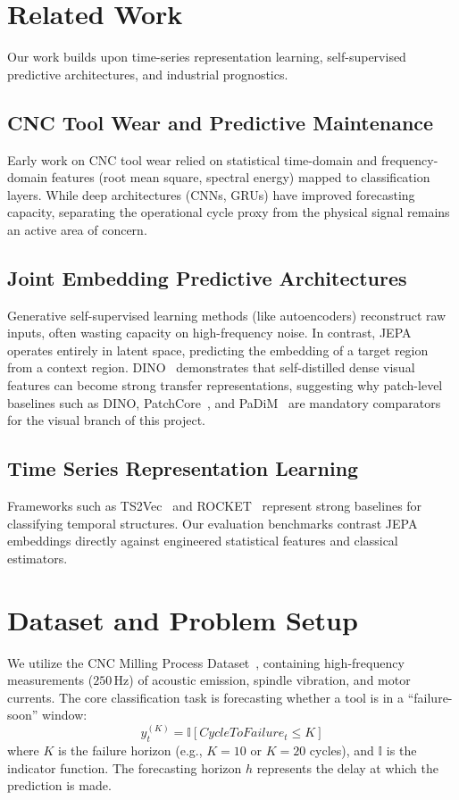 \documentclass[10pt,journal,compsoc]{IEEEtran}
\begin{document}
\section{Related Work}
Our work builds upon time-series representation learning, self-supervised predictive architectures, and industrial prognostics.

\subsection{CNC Tool Wear and Predictive Maintenance}
Early work on CNC tool wear relied on statistical time-domain and frequency-domain features (root mean square, spectral energy) mapped to classification layers. While deep architectures (CNNs, GRUs) have improved forecasting capacity, separating the operational cycle proxy from the physical signal remains an active area of concern.

\subsection{Joint Embedding Predictive Architectures}
Generative self-supervised learning methods (like autoencoders) reconstruct raw inputs, often wasting capacity on high-frequency noise. In contrast, JEPA~\cite{assran2023ijepa,feichtenhofer2024vjepa} operates entirely in latent space, predicting the embedding of a target region from a context region. DINO~\cite{caron2021dino,oquab2023dinov2} demonstrates that self-distilled dense visual features can become strong transfer representations, suggesting why patch-level baselines such as DINO, PatchCore~\cite{roth2022patchcore}, and PaDiM~\cite{defard2021padim} are mandatory comparators for the visual branch of this project.

\subsection{Time Series Representation Learning}
Frameworks such as TS2Vec~\cite{yue2022ts2vec} and ROCKET~\cite{dempster2020rocket} represent strong baselines for classifying temporal structures. Our evaluation benchmarks contrast JEPA embeddings directly against engineered statistical features and classical estimators.

\section{Dataset and Problem Setup}
We utilize the CNC Milling Process Dataset~\cite{nasa_cnc_dataset}, containing high-frequency measurements ($250\,\text{Hz}$) of acoustic emission, spindle vibration, and motor currents. The core classification task is forecasting whether a tool is in a ``failure-soon'' window:
\begin{equation}
    y_t^{(K)} = \mathbb{I}[CycleToFailure_t \le K]
\end{equation}
where $K$ is the failure horizon (e.g., $K=10$ or $K=20$ cycles), and $\mathbb{I}$ is the indicator function. The forecasting horizon $h$ represents the delay at which the prediction is made.
\end{document}
